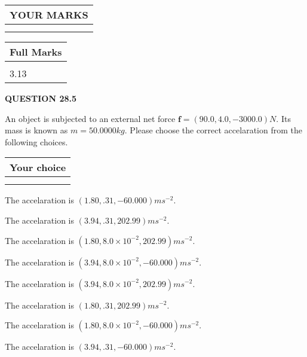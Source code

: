\documentclass[12pt]{article}
\begin{document}
\noindent\begin{tabular}{|l|}
\hline
 YOUR MARKS  \\
\hline
 \\ 
 \\ 
\hline
\end{tabular}
\hspace{0.05in} \begin{tabular}{|l|}
\hline
 Full Marks  \\
\hline
 \\ 
3.13 \\
\hline
\end{tabular}
{\textbf{\Large{QUESTION
28.5 
}}}
  
  
 
 
An object is subjected to an external net force $\mathbf{f}=
(90.0 , 4.0 , -3000.0) N$.
Its mass is known as $m= %
50.0000 kg$. Please choose the
correct accelaration from the following choices.
 
  
  
\noindent\hspace{3.0in} \begin{tabular}{|l|}
\hline
Your choice \\
\hline
 \\ 
 \\ 
\hline
\end{tabular}
  
  
 
 
The accelaration is $  %
(
1.80,
.31,
-60.000)
ms^{-2} $.
 
 
The accelaration is $  %
(
3.94,
.31,
202.99)
ms^{-2} $.
 
 
The accelaration is $  %
(
1.80,
8.0 \times 10^{-2},
202.99)
ms^{-2} $.
 
 
The accelaration is $  %
(
3.94,
8.0 \times 10^{-2},
-60.000)
ms^{-2} $.
 
 
The accelaration is $  %
(
3.94,
8.0 \times 10^{-2},
202.99)
ms^{-2} $.
 
 
The accelaration is $  %
(
1.80,
.31,
202.99)
ms^{-2} $.
 
 
The accelaration is $  %
(
1.80,
8.0 \times 10^{-2},
-60.000)
ms^{-2} $.
 
 
The accelaration is $  %
(
3.94,
.31,
-60.000)
ms^{-2} $.
 
\end{document}
